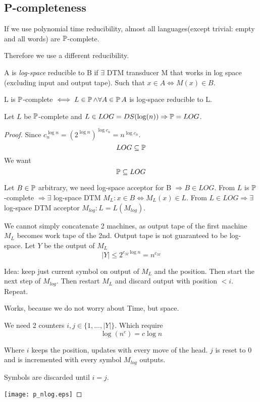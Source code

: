 \subsection{P-completeness}

\begin{note}
	If we use polynomial time reducibility, almost all languages(except trivial: empty and all words) are $\TP$-complete.

	Therefore we use a different reducibility.
\end{note}

\begin{definition}
	A is \emph{log-space} reducible to B if $\exists$ DTM transducer M that works in log space (excluding input and output tape).
	Such that $x \in A \iff M(x) \in B $.
\end{definition}

\begin{definition}[$\TP$-complete]
	L is $\TP$-complete $\iff L \in \operatorname{\mathbb{P}} \land \forall A \in \operatorname{\mathbb{P}} A$ is log-space reducible to L.
\end{definition}

\begin{theorem}
	Let $L$ be $\TP$-complete and $L \in LOG = DS(\log(n)) \Rightarrow \operatorname{\mathbb{P}} = LOG$.
\end{theorem}
\begin{proof}
	Since $c_n^{\log n} = (2^{\log n})^{\log c_n} = n^{\log c_n}$.
	\[ LOG \subseteq \operatorname{\mathbb{P}} \]
	We want
	\[ \operatorname{\mathbb{P}} \subseteq LOG \]

	Let $B \in \operatorname{\mathbb{P}}$ arbitrary, we need log-space acceptor for B $\Rightarrow B \in LOG$.
	From $L$ is $\TP$-complete $\Rightarrow \exists$ log-space DTM $M_L: x \in B \iff M_L(x) \in L$.
	From $L \in LOG \Rightarrow \exists $ log-space DTM acceptor $M_{log}: L = L(M_{log}) $.

	We cannot simply concatenate 2 machines, as output tape of the first machine $M_L$ becomes work tape of the 2nd.
	Output tape is not guaranteed to be log-space.
	Let $Y$ be the output of $M_L$
	\[ |Y| \leq 2^{c_M \log n} = n^{c_M} \]

	Idea: keep just current symbol on output of $M_L$ and the position.
	Then start the next step of $M_{log}$.
	Then restart $M_L$ and discard output with position $ < i$.
	Repeat.

	Works, because we do not worry about Time, but space.

	We need 2 counters $i, j \in \{ 1, \ldots, |Y| \}$.
	Which require
	\[ \log(n^c) = c \log n \]

	Where $i$ keeps the position, updates with every move of the head.
	$j$ is reset to $0$ and is incremented with every symbol $M_{log}$ outputs.

	Symbols are discarded until $i = j$.

	\texttt{[image: p\_nlog.eps]}
\end{proof}

